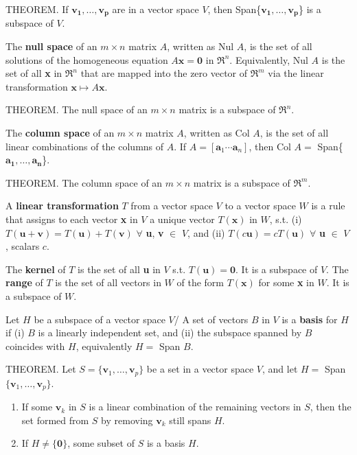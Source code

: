 \documentclass{article}
\begin{document}
\hfill \newline THEOREM. If $\mathbf{v_1},\dots,\mathbf{v_p}$ are in a vector space $V$, then Span\{$\mathbf{v_1},\dots,\mathbf{v_p}$\} is a subspace of $V$. 

\hfill \newline The \textbf{null space} of an $m \times n$ matrix $A$, written as Nul $A$, is the set of all solutions of the homogeneous equation $A\textbf{x}=\textbf{0}$ in $\Re^n$. Equivalently, Nul $A$ is the set of all \textbf{x} in $\Re^n$ that are mapped into the zero vector of $\Re^m$ via the linear transformation $\textbf{x} \mapsto A\textbf{x}$.

\hfill \newline THEOREM. The null space of an $m \times n$ matrix is a subspace of $\Re^n$.

\hfill \newline The \textbf{column space} of an $m \times n$ matrix $A$, written as Col $A$, is the set of all linear combinations of the columns of $A$. If $A = [\textbf{a}_1\cdots \textbf{a}_n]$, then Col $A =$ Span\{$\mathbf{a_1},\dots,\mathbf{a_n}$\}.

\hfill \newline THEOREM. The column space of an $m \times n$ matrix is a subspace of $\Re^m$.

\hfill \newline A \textbf{linear transformation} $T$ from a vector space $V$ to a vector space $W$ is a rule that assigns to each vector \textbf{x} in $V$ a unique vector $T(\textbf{x})$ in $W$, s.t. (i) $T(\textbf{u}+\textbf{v})=T(\textbf{u})+T(\textbf{v})$ $\forall$ \textbf{u}, \textbf{v} $\in$ $V$, and (ii) $T(c\textbf{u})=cT(\textbf{u})$ $\forall$ \textbf{u} $\in$ $V$, scalars $c$.

\hfill \newline The \textbf{kernel} of $T$ is the set of all \textbf{u} in $V$ s.t. $T(\textbf{u})=\textbf{0}$. It is a subspace of $V$. The \textbf{range} of $T$ is the set of all vectors in $W$ of the form $T(\textbf{x})$ for some \textbf{x} in $W$. It is a subspace of $W$.

\hfill \newline Let $H$ be a subspace of a vector space $V$/ A set of vectors $B$ in $V$ is a \textbf{basis} for $H$ if (i) $B$ is a linearly independent set, and (ii) the subspace spanned by $B$ coincides with $H$, equivalently $H =$ Span $B$.

\hfill \newline THEOREM. Let $S = \{\textbf{v}_1,\dots,\textbf{v}_p\}$ be a set in a vector space $V$, and let $H =$ Span$\{\textbf{v}_1,\dots,\textbf{v}_p\}$.
\begin{enumerate}
    \item If some $\textbf{v}_k$ in $S$ is a linear combination of the remaining vectors in $S$, then the set formed from $S$ by removing $\textbf{v}_k$ still spans $H$.
    \item If $H \neq \{\textbf{0}\}$, some subset of $S$ is a basis $H$.
\end{enumerate}
\end{document}
